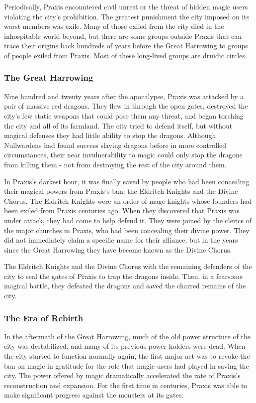       Periodically, Praxis encountered civil unrest or the threat of hidden magic users violating the city's prohibition.
      The greatest punishment the city imposed on its worst members was exile.
      Many of those exiled from the city died in the inhospitable world beyond, but there are some groups outside Praxis that can trace their origins back hundreds of years before the Great Harrowing to groups of people exiled from Praxis.
      Most of these long-lived groups are druidic circles.

    \subsubsection{The Great Harrowing}
      Nine hundred and twenty years after the apocalypse, Praxis was attacked by a pair of massive red dragons.
      They flew in through the open gates, destroyed the city's few static weapons that could pose them any threat, and began torching the city and all of its farmland.
      The city tried to defend itself, but without magical defenses they had little ability to stop the dragons.
      Although Nullwardens had found success slaying dragons before in more controlled circumstances, their near invulnerability to magic could only stop the dragons from killing them - not from destroying the rest of the city around them.

      In Praxis's darkest hour, it was finally saved by people who had been concealing their magical powers from Praxis's ban: the Eldritch Knights and the Divine Chorus.
      The Eldritch Knights were an order of mage-knights whose founders had been exiled from Praxis centuries ago.
      When they discovered that Praxis was under attack, they had come to help defend it.
      They were joined by the clerics of the major churches in Praxis, who had been concealing their divine power.
      They did not immediately claim a specific name for their alliance, but in the years since the Great Harrowing they have become known as the Divine Chorus.

      The Eldritch Knights and the Divine Chorus with the remaining defenders of the city to seal the gates of Praxis to trap the dragons inside.
      Then, in a fearsome magical battle, they defeated the dragons and saved the charred remains of the city.

    \subsubsection{The Era of Rebirth}
      In the aftermath of the Great Harrowing, much of the old power structure of the city was destabilized, and many of its previous power holders were dead.
      When the city started to function normally again, the first major act was to revoke the ban on magic in gratitude for the role that magic users had played in saving the city.
      The power offered by magic dramatically accelerated the rate of Praxis's reconstruction and expansion.
      For the first time in centuries, Praxis was able to make significant progress against the monsters at its gates.

